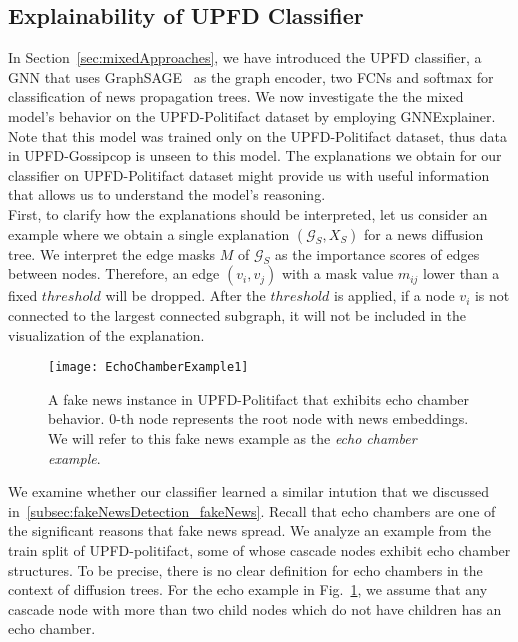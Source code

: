 \subsection{Explainability of UPFD Classifier}
\label{subsec:ExplaniningGNNs_ExplainingUPFDClassifier}
In Section~\ref{sec:mixedApproaches}, we have introduced the UPFD classifier, a GNN that uses GraphSAGE~\parencite{GraphSAGE_Hamilton} as the graph encoder, two FCNs and softmax for classification of news propagation trees. We now investigate the the mixed model's behavior on the UPFD-Politifact dataset by employing GNNExplainer. Note that this model was trained only on the UPFD-Politifact dataset, thus data in UPFD-Gossipcop is unseen to this model. The explanations we obtain for our classifier on UPFD-Politifact dataset might provide us with useful information that allows us to understand the model's reasoning.\\
First, to clarify how the explanations should be interpreted, let us consider an example where we obtain a single explanation $(\mathcal{G}_S, X_S)$ for a news diffusion tree. We interpret the edge masks $M$ of $\mathcal{G}_S$ as the importance scores of edges between nodes. Therefore, an edge $(v_i, v_j)$ with a mask value $m_{ij}$ lower than a fixed $threshold$ will be dropped. After the $threshold$ is applied, if a node $v_i$ is not connected to the largest connected subgraph, it will not be included in the visualization of the explanation. \\
\begin{figure}
    \centering
    \texttt{[image: EchoChamberExample1]}
    \caption[Echo chamber example from UPFD-Politifact.]{A fake news instance in UPFD-Politifact that exhibits echo chamber behavior. $0$-th node represents the root node with news embeddings. We will refer to this fake news example as the \emph{echo chamber example}.}
    \label{fig:echoChamberExample1}
\end{figure}
We examine whether our classifier learned a similar intution that we discussed in~\ref{subsec:fakeNewsDetection_fakeNews}. Recall that echo chambers are one of the significant reasons that fake news spread. We analyze an example from the train split of UPFD-politifact, some of whose cascade nodes exhibit echo chamber structures. To be precise, there is no clear definition for echo chambers in the context of diffusion trees. For the echo example in Fig.~\ref{fig:echoChamberExample1}, we assume that any cascade node with more than two child nodes which do not have children has an echo chamber.\\
